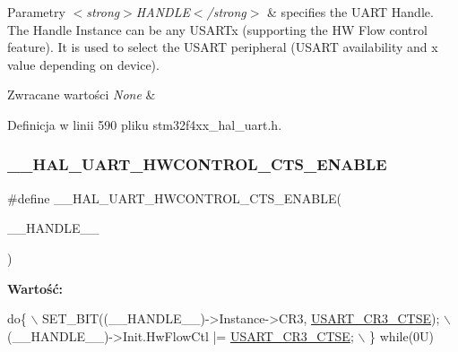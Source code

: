 \begin{DoxyParams}{Parametry}
{\em $<$strong$>$\+H\+A\+N\+D\+L\+E$<$/strong$>$} & specifies the U\+A\+RT Handle. The Handle Instance can be any U\+S\+A\+R\+Tx (supporting the HW Flow control feature). It is used to select the U\+S\+A\+RT peripheral (U\+S\+A\+RT availability and x value depending on device). \\
\hline
\end{DoxyParams}

\begin{DoxyRetVals}{Zwracane wartości}
{\em None} & \\
\hline
\end{DoxyRetVals}


Definicja w linii 590 pliku stm32f4xx\+\_\+hal\+\_\+uart.\+h.

\mbox{\label{group___u_a_r_t___exported___macros_ga4a77213945844bca4c22ba6a14b7ee4c}} 
\subsubsection{\texorpdfstring{\+\_\+\+\_\+\+H\+A\+L\+\_\+\+U\+A\+R\+T\+\_\+\+H\+W\+C\+O\+N\+T\+R\+O\+L\+\_\+\+C\+T\+S\+\_\+\+E\+N\+A\+B\+LE}{\_\_HAL\_UART\_HWCONTROL\_CTS\_ENABLE}}
{\footnotesize\ttfamily \#define \+\_\+\+\_\+\+H\+A\+L\+\_\+\+U\+A\+R\+T\+\_\+\+H\+W\+C\+O\+N\+T\+R\+O\+L\+\_\+\+C\+T\+S\+\_\+\+E\+N\+A\+B\+LE(\begin{DoxyParamCaption}\item[{}]{\+\_\+\+\_\+\+H\+A\+N\+D\+L\+E\+\_\+\+\_\+ }\end{DoxyParamCaption})}

{\bfseries Wartość\+:}
\begin{DoxyCode}
\textcolor{keywordflow}{do}\{                                                      \(\backslash\)
    SET\_BIT((\_\_HANDLE\_\_)->Instance->CR3, \hyperlink{group___peripheral___registers___bits___definition_gaa125f026b1ca2d76eab48b191baed265}{USART\_CR3\_CTSE});  \(\backslash\)
    (\_\_HANDLE\_\_)->Init.HwFlowCtl |= \hyperlink{group___peripheral___registers___bits___definition_gaa125f026b1ca2d76eab48b191baed265}{USART\_CR3\_CTSE};        \(\backslash\)
  \} \textcolor{keywordflow}{while}(0U)
\end{DoxyCode}


